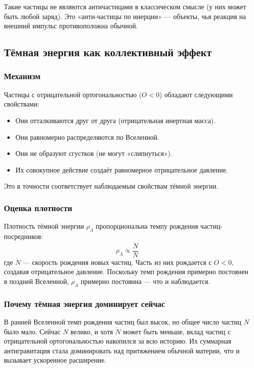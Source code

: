 \documentclass[12pt,a4paper]{article}
\begin{document}
Такие частицы не являются античастицами в классическом смысле (у них может быть любой заряд). Это «анти-частицы по инерции» --- объекты, чья реакция на внешний импульс противоположна обычной.

\subsection{Тёмная энергия как коллективный эффект}

\subsubsection{Механизм}
Частицы с отрицательной ортогональностью ($O < 0$) обладают следующими свойствами:
\begin{itemize}
    \item Они отталкиваются друг от друга (отрицательная инертная масса).
    \item Они равномерно распределяются по Вселенной.
    \item Они не образуют сгустков (не могут «слипнуться»).
    \item Их совокупное действие создаёт равномерное отрицательное давление.
\end{itemize}

Это в точности соответствует наблюдаемым свойствам тёмной энергии.

\subsubsection{Оценка плотности}
Плотность тёмной энергии $\rho_\Lambda$ пропорциональна темпу рождения частиц-посредников:
\begin{equation}
    \rho_\Lambda \propto \frac{\dot{N}}{N}
\end{equation}
где $\dot{N}$ --- скорость рождения новых частиц. Часть из них рождается с $O < 0$, создавая отрицательное давление. Поскольку темп рождения примерно постоянен в поздней Вселенной, $\rho_\Lambda$ примерно постоянна --- что и наблюдается.

\subsubsection{Почему тёмная энергия доминирует сейчас}
В ранней Вселенной темп рождения частиц был высок, но общее число частиц $N$ было мало. Сейчас $N$ велико, и хотя $\dot{N}$ может быть меньше, вклад частиц с отрицательной ортогональностью накопился за всю историю. Их суммарная антигравитация стала доминировать над притяжением обычной материи, что и вызывает ускоренное расширение.
\end{document}
